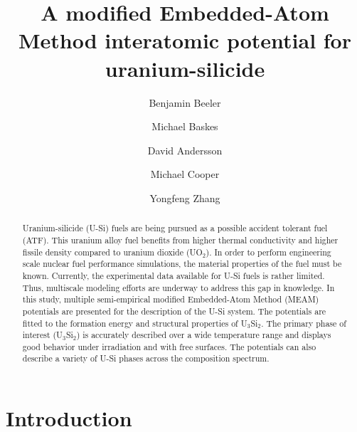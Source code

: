 \documentclass[review]{elsarticle}
\begin{document}
\begin{frontmatter}
\title{A modified Embedded-Atom Method interatomic potential for uranium-silicide}

\author[inl]{Benjamin Beeler}
\author[lanl,ucsd,msu]{Michael Baskes}
\author[lanl]{David Andersson}
\author[lanl]{Michael Cooper}
\author[inl]{Yongfeng Zhang}
\address[inl]{Idaho National Laboratory, Idaho Falls, ID 83415}
\address[lanl]{Los Alamos National Laboratory, Los Alamos, NM 87545}
\address[ucsd]{University of California-San Diego, San Diego, CA 92093}
\address[msu]{Mississippi State University, MS 39762}


\begin{abstract}

Uranium-silicide (U-Si) fuels are being pursued as a possible accident tolerant fuel (ATF).  This uranium alloy fuel benefits from higher thermal conductivity and higher fissile density compared to uranium dioxide (UO$_{2}$).  In order to perform engineering scale nuclear fuel performance simulations, the material properties of the fuel must be known.  Currently, the experimental data available for U-Si fuels is rather limited.  Thus, multiscale modeling efforts are underway to address this gap in knowledge.  In this study, multiple semi-empirical modified Embedded-Atom Method (MEAM) potentials are presented for the description of the U-Si system.  The potentials are fitted to the formation energy and structural properties of U$_{3}$Si$_{2}$. The primary phase of interest (U$_{3}$Si$_{2}$) is accurately described over a wide temperature range and displays good behavior under irradiation and with free surfaces.  The potentials can also describe a variety of U-Si phases across the composition spectrum.  

\end{abstract}
\end{frontmatter}

\section{Introduction}
\end{document}
